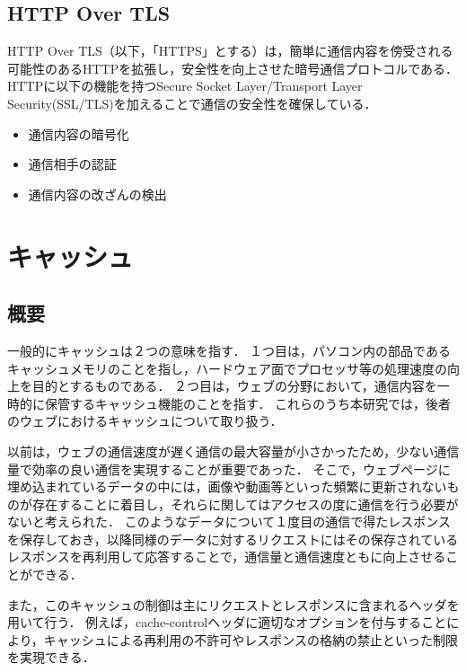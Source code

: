 \documentclass[12pt,a4paper]{jbook}
\begin{document}
\subsection{HTTP Over TLS}
\label{sec:https}
HTTP Over TLS\cite{https}（以下，「HTTPS」とする）は，簡単に通信内容を傍受される可能性のあるHTTPを拡張し，安全性を向上させた暗号通信プロトコルである．
HTTPに以下の機能を持つSecure Socket Layer/Transport Layer Security(SSL/TLS)を加えることで通信の安全性を確保している．
\begin{itemize}
\item 通信内容の暗号化
\item 通信相手の認証
\item 通信内容の改ざんの検出
\end{itemize}

\section{キャッシュ}
\label{sec:cache}
\subsection{概要}
一般的にキャッシュは２つの意味を指す．
１つ目は，パソコン内の部品であるキャッシュメモリのことを指し，ハードウェア面でプロセッサ等の処理速度の向上を目的とするものである．
２つ目は，ウェブの分野において，通信内容を一時的に保管するキャッシュ機能のことを指す．
これらのうち本研究では，後者のウェブにおけるキャッシュについて取り扱う．

以前は，ウェブの通信速度が遅く通信の最大容量が小さかったため，少ない通信量で効率の良い通信を実現することが重要であった．
そこで，ウェブページに埋め込まれているデータの中には，画像や動画等といった頻繁に更新されないものが存在することに着目し，それらに関してはアクセスの度に通信を行う必要がないと考えられた．
このようなデータについて１度目の通信で得たレスポンスを保存しておき，以降同様のデータに対するリクエストにはその保存されているレスポンスを再利用して応答することで，通信量と通信速度ともに向上させることができる．

また，このキャッシュの制御は主にリクエストとレスポンスに含まれるヘッダを用いて行う．
例えば，cache-controlヘッダに適切なオプションを付与することにより，キャッシュによる再利用の不許可やレスポンスの格納の禁止といった制限を実現できる．
\end{document}
